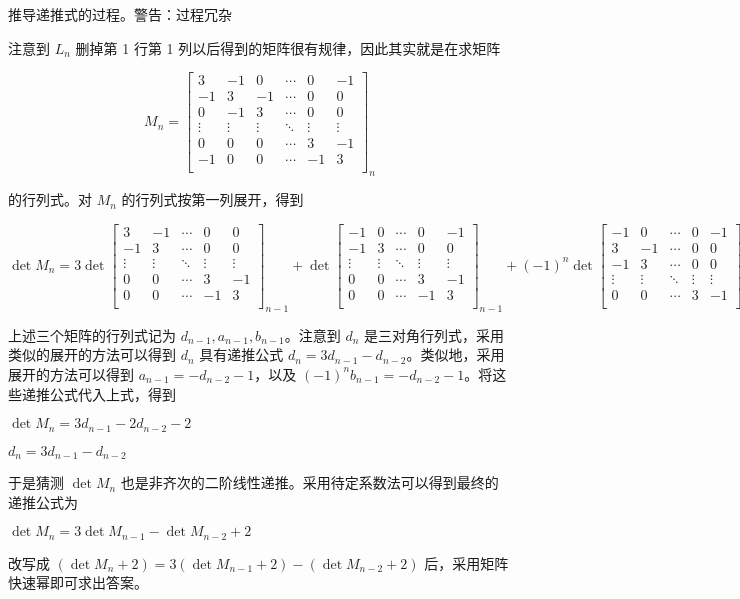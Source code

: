\begin{DANGER}{推导递推式的过程。警告：过程冗杂}{}

注意到 $L_n$ 删掉第 1 行第 1 列以后得到的矩阵很有规律，因此其实就是在求矩阵

$$
M_n = \begin{bmatrix}
3&  -1&  0&  \cdots&  0&  -1\\
-1&  3&  -1&  \cdots&  0&  0\\
0&  -1&  3&  \cdots&  0&  0\\
\vdots&  \vdots&  \vdots&  \ddots&  \vdots&  \vdots\\
0&  0&  0&  \cdots&  3&  -1\\
-1&  0&  0&  \cdots&  -1&  3\\
\end{bmatrix}_{n}
$$

的行列式。对 $M_n$ 的行列式按第一列展开，得到

$$
\det M_n = 3\det \begin{bmatrix}
3&  -1&  \cdots&  0&  0\\
-1&  3&  \cdots&  0&  0\\
\vdots&  \vdots&  \ddots&  \vdots&  \vdots\\
0&  0&  \cdots&  3&  -1\\
0&  0&  \cdots&  -1&  3\\
\end{bmatrix}_{n-1} + \det\begin{bmatrix}
-1&  0&  \cdots&  0&  -1\\
-1&  3&  \cdots&  0&  0\\
\vdots&  \vdots&  \ddots&  \vdots&  \vdots\\
0&  0&  \cdots&  3&  -1\\
0&  0&  \cdots&  -1&  3\\
\end{bmatrix}_{n-1} + (-1)^n \det\begin{bmatrix}
-1&  0&  \cdots&  0&  -1\\
3&  -1&  \cdots&  0&  0\\
-1&  3&  \cdots&  0&  0\\
\vdots&  \vdots&  \ddots&  \vdots&  \vdots\\
0&  0&  \cdots&  3&  -1\\
\end{bmatrix}_{n-1}
$$

上述三个矩阵的行列式记为 $d_{n-1}, a_{n-1}, b_{n-1}$。注意到 $d_n$ 是三对角行列式，采用类似的展开的方法可以得到 $d_n$ 具有递推公式 $d_n=3d_{n-1}-d_{n-2}$。类似地，采用展开的方法可以得到 $a_{n-1}=-d_{n-2}-1$，以及 $(-1)^n b_{n-1}=-d_{n-2}-1$。将这些递推公式代入上式，得到

$\det M_n = 3d_{n-1}-2d_{n-2}-2$

$d_n = 3d_{n-1}-d_{n-2}$

于是猜测 $\det M_n$ 也是非齐次的二阶线性递推。采用待定系数法可以得到最终的递推公式为

$\det M_n = 3\det M_{n-1} - \det M_{n-2} + 2$

改写成 $(\det M_n+2) = 3(\det M_{n-1}+2) - (\det M_{n-2} + 2)$ 后，采用矩阵快速幂即可求出答案。

\end{DANGER}


